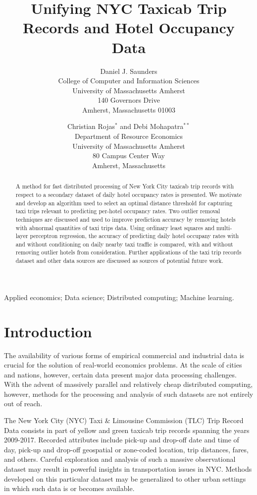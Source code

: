 \documentclass[useAMS, usenatbib]{biom}
\title{Unifying NYC Taxicab Trip Records and Hotel Occupancy Data}
\author
{Daniel J. Saunders \emailx{djsaunde@cs.umass.edu} \\
College of Computer and Information Sciences \\
University of Massachusetts Amherst \\
140 Governors Drive \\
Amherst, Massachusetts 01003
\and
Christian Rojas$^{*}$\email{rojas@resecon.umass.edu} and
Debi Mohapatra$^{**}$\email{dmohapatra@umass.edu} \\
Department of Resource Economics \\
University of Massachusetts Amherst \\
80 Campus Center Way \\
Amherst, Massachusetts}
\begin{document}
\label{firstpage}

\begin{abstract}
A method for fast distributed processing of New York City taxicab trip records with respect to a secondary dataset of daily hotel occupancy rates is presented. We motivate and develop an algorithm used to select an optimal distance threshold for capturing taxi trips relevant to predicting per-hotel occupancy rates. Two outlier removal techniques are discussed and used to improve prediction accuracy by removing hotels with abnormal quantities of taxi trips data. Using ordinary least squares and multi-layer perceptron regression, the accuracy of predicting daily hotel occupany rates with and without conditioning on daily nearby taxi traffic is compared, with and without removing outlier hotels from consideration. Further applications of the taxi trip records dataset and other data sources are discussed as sources of potential future work.
\end{abstract}

\begin{keywords}
Applied economics; Data science; Distributed computing; Machine learning.
\end{keywords}

\maketitle

\section{Introduction}
\label{s:intro}

The availability of various forms of empirical commercial and industrial data is crucial for the solution of real-world economics problems. At the scale of cities and nations, however, certain data present major data processing challenges. With the advent of massively parallel and relatively cheap distributed computing, however, methods for the processing and analysis of such datasets are not entirely out of reach.

The New York City (NYC) Taxi \& Limousine Commission (TLC) Trip Record Data consists in part of yellow and green taxicab trip records spanning the years 2009-2017. Recorded attributes include pick-up and drop-off date and time of day, pick-up and drop-off geospatial or zone-coded location, trip distances, fares, and others. Careful exploration and analysis of such a massive observational dataset may result in powerful insights in transportation issues in NYC. Methods developed on this particular dataset may be generalized to other urban settings in which such data is or becomes available.
\end{document}
